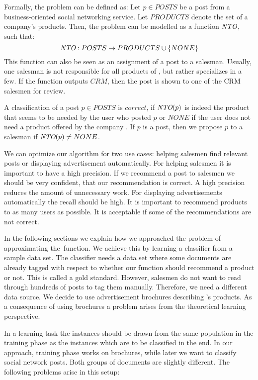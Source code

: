 Formally, the problem can be defined as:
Let $p \in POSTS$ be a post from a business-oriented social networking service.
Let $PRODUCTS$ denote the set of a company's products.
Then, the problem can be modelled as a function $\emph{NTO}$, such that:
\begin{displaymath}
	\emph{NTO}: POSTS \to PRODUCTS \cup \{NONE\}
\end{displaymath}
This function can also be seen as an assignment of a post to a salesman.
Usually, one salesman is not responsible for all products of \acme, but rather specializes in a few.
If the \nto function outputs $CRM$, then the post is shown to one of the CRM salesmen for review.

A classification of a post $p \in POSTS$ is $correct$, if $\emph{NTO}(p)$ is indeed the product that seems to be needed by the user who posted $p$ or $NONE$ if the user does not need a product offered by the company \acme.
If $p$ is a post, then we propose $p$ to a salesman if $\emph{NTO}(p) \neq NONE$.

We can optimize our algorithm for two use cases: helping salesmen find relevant posts or displaying advertisement automatically.
For helping salesmen it is important to have a high precision.
If we recommend a post to salesmen we should be very confident, that our recommendation is correct.
A high precision reduces the amount of unnecessary work.
For displaying advertisements automatically the recall should be high.
It is important to recommend products to as many users as possible.
It is acceptable if some of the recommendations are not correct.

In the following sections we explain how we approached the problem of approximating the~\nto function.
We achieve this by learning a classifier from a sample data set.
The classifier needs a data set where some documents are already tagged with respect to whether our \nto function should recommend a product or not.
This is called a gold standard.
However, salesmen do not want to read through hundreds of posts to tag them manually.
Therefore, we need a different data source.
We decide to use advertisement brochures describing \acme's products.
As a consequence of using brochures a problem arises from the theoretical learning perspective.

In a learning task the instances should be drawn from the same population in the training phase as the instances which are to be classified in the end.
In our approach, training phase works on brochures, while later we want to classify social network posts.
Both groups of documents are slightly different.
The following problems arise in this setup:

